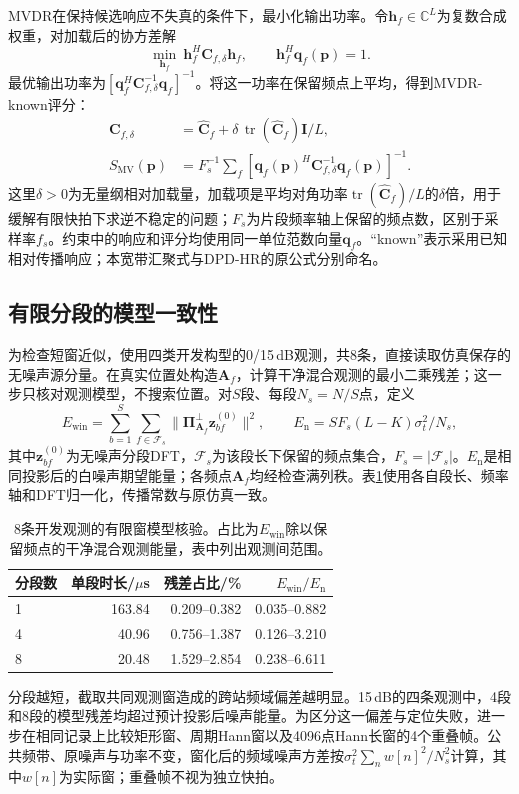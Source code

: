 \documentclass[a4paper]{cas-sc}
\numberwithin{equation}{section}
\numberwithin{figure}{section}
\numberwithin{table}{section}
\newcommand{\C}{\mathbb C}
\newcommand{\tr}{\operatorname{tr}}
\begin{document}
MVDR在保持候选响应不失真的条件下，最小化输出功率\cite{Capon1969}。令$\bm h_f\in\C^L$为复数合成权重，对加载后的协方差解
\begin{equation}
 \min_{\bm h_f}\ \bm h_f^H\bm C_{f,\delta}\bm h_f,
 \qquad \bm h_f^H\bm q_f(\bm p)=1.\label{eq:mvdrConstraint}
\end{equation}
最优输出功率为$[\bm q_f^H\bm C_{f,\delta}^{-1}\bm q_f]^{-1}$。将这一功率在保留频点上平均，得到MVDR-known评分：
\begin{align}
 \bm C_{f,\delta}&=\widehat{\bm C}_f+
 \delta\,\tr(\widehat{\bm C}_f)\bm I/L,\nonumber\\
 S_{\mathrm{MV}}(\bm p)&=F_s^{-1}\sum_f
 [\bm q_f(\bm p)^H\bm C_{f,\delta}^{-1}\bm q_f(\bm p)]^{-1} .\label{eq:mvdr}
\end{align}
这里$\delta>0$为无量纲相对加载量，加载项是平均对角功率$\tr(\widehat{\bm C}_f)/L$的$\delta$倍，用于缓解有限快拍下求逆不稳定的问题；$F_s$为片段频率轴上保留的频点数，区别于采样率$f_s$。约束中的响应和评分均使用同一单位范数向量$\bm q_f$。“known”表示采用已知相对传播响应；本宽带汇聚式与DPD-HR的原公式分别命名\cite{TirerWeiss2016}。

\subsection{有限分段的模型一致性}\label{app:segmentcheck}
为检查短窗近似，使用四类开发构型的0/15\,dB观测，共8条，直接读取仿真保存的无噪声源分量。在真实位置处构造$\bm A_f$，计算干净混合观测的最小二乘残差；这一步只核对观测模型，不搜索位置。对$S$段、每段$N_s=N/S$点，定义
\begin{equation}
 E_{\mathrm{win}}=\sum_{b=1}^{S}\sum_{f\in\mathcal F_s}
 \|\bm\Pi_{\bm A_f}^{\perp}\bm z_{bf}^{(0)}\|^2,\qquad
 E_{\mathrm n}=SF_s(L-K)\sigma_t^2/N_s ,
 \label{eq:windowdiagnostic}
\end{equation}
其中$\bm z_{bf}^{(0)}$为无噪声分段DFT，$\mathcal F_s$为该段长下保留的频点集合，$F_s=|\mathcal F_s|$。$E_{\mathrm n}$是相同投影后的白噪声期望能量；各频点$\bm A_f$均经检查满列秩。表\ref{tab:windowdiagnostic}使用各自段长、频率轴和DFT归一化，传播常数与原仿真一致。

\begin{table}[pos=H]\centering\small
\caption{8条开发观测的有限窗模型核验。占比为$E_{\mathrm{win}}$除以保留频点的干净混合观测能量，表中列出观测间范围。}\label{tab:windowdiagnostic}
\begin{tabular}{@{}lrrr@{}}\toprule
分段数 & 单段时长/$\mu$s & 残差占比/\% & $E_{\mathrm{win}}/E_{\mathrm n}$\\\midrule
1 & 163.84 & 0.209--0.382 & 0.035--0.882\\
4 & 40.96 & 0.756--1.387 & 0.126--3.210\\
8 & 20.48 & 1.529--2.854 & 0.238--6.611\\\bottomrule
\end{tabular}\end{table}
分段越短，截取共同观测窗造成的跨站频域偏差越明显。15\,dB的四条观测中，4段和8段的模型残差均超过预计投影后噪声能量。为区分这一偏差与定位失败，进一步在相同记录上比较矩形窗、周期Hann窗以及4096点Hann长窗的4个重叠帧。公共频带、原噪声与功率不变，窗化后的频域噪声方差按$\sigma_t^2\sum_n w[n]^2/N_s^2$计算，其中$w[n]$为实际窗；重叠帧不视为独立快拍。
\end{document}

